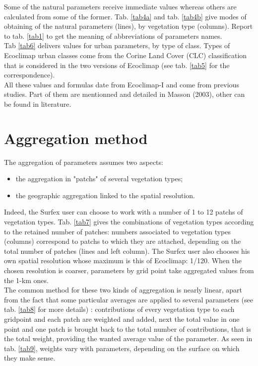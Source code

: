 Some of the natural parameters receive immediate values whereas others are calculated from some of the former. Tab. \ref{tab4a} 
and tab. \ref{tab4b} give modes of obtaining of the natural parameters (lines), by vegetation type (columns). 
Report to tab. \ref{tab1} to get the meaning of abbreviations of parameters names.\\ 
Tab \ref{tab6} delivers values for urban parameters, by type of class. 
Types of Ecoclimap urban classes come from the Corine Land Cover (CLC) classification that is considered in the two 
versions of Ecoclimap (see tab. \ref{tab5} for the correspondence).\\
All these values and formulas date from Ecoclimap-I and come from previous studies. Part of them are mentionned and detailed 
in Masson \etal (2003)\nocite{masson_2003}, other can be found in literature. 

\section{Aggregation method}

The aggregation of parameters assumes two aspects: 
\begin{itemize}
\item{the aggregation in "patchs" of several vegetation types;}
\item{the geographic aggregation linked to the spatial resolution.}
\end{itemize}
Indeed, the Surfex user can choose to work with a number of 1 to 12 patchs of vegetation types. 
Tab. \ref{tab7} gives the combinations of vegetation types according to the retained number of patches: numbers associated to vegetation types 
(columns) correspond to patchs to which they are attached, depending on the total number of patches (lines and left column). 
The Surfex user also chooses his own spatial resolution whose maximum is this of Ecoclimap: 1/120\textdegree. 
When the chosen resolution is coarser, 
parameters by grid point take aggregated values from the 1-km ones.\\ 
The common method for these two kinds of aggregation is nearly linear, apart from the fact that some particular 
averages are applied to several parameters (see tab. \ref{tab8} for more details) : 
contributions of every vegetation type to each gridpoint and each patch are weighted and added, next the total value in one point 
and one patch is brought back to the total number of contributions, that is the total weight, providing the 
wanted average value of the parameter. As seen in tab. \ref{tab9}, weights vary with parameters, depending on 
the surface on which they make sense. 

